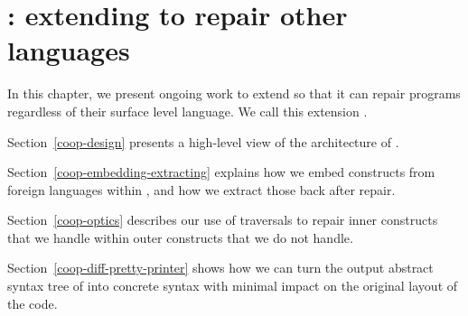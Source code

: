 \chapter{\Coop{}: extending \Chick{} to repair other languages}

In this chapter, we present ongoing work to extend \Chick{} so that it can
repair programs regardless of their surface level language.  We call this
extension \Coop{}.

Section~\ref{coop-design} presents a high-level view of the architecture of
\Coop{}.

Section~\ref{coop-embedding-extracting} explains how we embed constructs from
foreign languages within \Chick{}, and how we extract those back after repair.

Section~\ref{coop-optics} describes our use of traversals to repair inner
constructs that we handle within outer constructs that we do not handle.

Section~\ref{coop-diff-pretty-printer} shows how we can turn the output abstract
syntax tree of \Coop{} into concrete syntax with minimal impact on the original
layout of the code.





